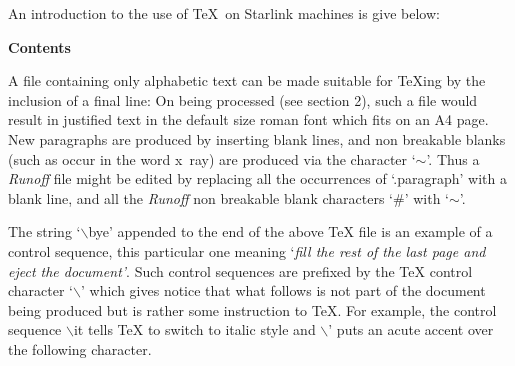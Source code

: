 An introduction to the use of \TeX\  on Starlink machines is give below:

\bigskip

{\bf \big Contents}

\medskip
\medskip
{}
\medskip     
{}
\medskip
{}
\medskip
{}



\vfil\eject
{}
 
A file containing only alphabetic text can be made suitable for \TeX ing by 
the inclusion of a final line:
\medskip
{}
On being processed (see section 2), such a file would result in
justified text in the default size roman font which fits on an A4 page.
New paragraphs are produced by inserting blank lines, and non breakable blanks
(such as occur in the word x~ray) are produced via the character 
`\th$\sim$\th'. 
Thus a {\it Runoff}{} file might be edited by replacing all the occurrences of
`.paragraph' with a blank line, and all the {\it Runoff} non breakable blank
characters `\#' with `\th$\sim$\th'.



The string `$\backslash$bye' appended to the end of the above {\TeX} file 
is an example 
of a control sequence, this particular one meaning `{\it fill the rest of
the last page and eject the document'}.
Such control sequences are prefixed by the {\TeX} control character 
`$\backslash$'
 which gives 
notice that what follows is not part of the document being produced but is 
rather some instruction to \TeX. 
For example, the control sequence $\backslash$it tells {\TeX} to 
switch to italic style 
and $\backslash$' puts an acute accent over the following character.

